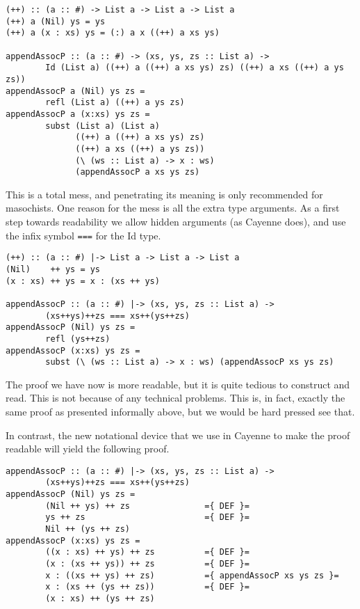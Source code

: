 \documentclass{llncs}[12pt]             %
\newcommand{\te}[1]{{\tt #1}}
\begin{document}
\begin{verbatim}
(++) :: (a :: #) -> List a -> List a -> List a
(++) a (Nil) ys = ys
(++) a (x : xs) ys = (:) a x ((++) a xs ys)

appendAssocP :: (a :: #) -> (xs, ys, zs :: List a) -> 
        Id (List a) ((++) a ((++) a xs ys) zs) ((++) a xs ((++) a ys zs))
appendAssocP a (Nil) ys zs = 
        refl (List a) ((++) a ys zs)
appendAssocP a (x:xs) ys zs =
        subst (List a) (List a) 
              ((++) a ((++) a xs ys) zs)
              ((++) a xs ((++) a ys zs))
              (\ (ws :: List a) -> x : ws)
              (appendAssocP a xs ys zs)
\end{verbatim}

This is a total mess, and penetrating its meaning is only recommended for
masochists.  One reason for the mess is all the extra type arguments.  As a first step
towards readability
we allow hidden arguments (as Cayenne does), and use the infix symbol \te{===}
for the Id type.

\begin{verbatim}
(++) :: (a :: #) |-> List a -> List a -> List a
(Nil)    ++ ys = ys
(x : xs) ++ ys = x : (xs ++ ys)

appendAssocP :: (a :: #) |-> (xs, ys, zs :: List a) -> 
        (xs++ys)++zs === xs++(ys++zs)
appendAssocP (Nil) ys zs = 
        refl (ys++zs)
appendAssocP (x:xs) ys zs =
        subst (\ (ws :: List a) -> x : ws) (appendAssocP xs ys zs)
\end{verbatim}

The proof we have now is more readable, but it is quite tedious to construct
and read.  This is not because of any technical problems.  This is, in fact,
exactly the same proof as presented informally above, but we would be hard pressed
see that.

In contrast, the new notational device that we use in Cayenne to make the proof readable will
yield the following proof.

\begin{verbatim}
appendAssocP :: (a :: #) |-> (xs, ys, zs :: List a) -> 
        (xs++ys)++zs === xs++(ys++zs)
appendAssocP (Nil) ys zs =
        (Nil ++ ys) ++ zs               ={ DEF }=
        ys ++ zs                        ={ DEF }=
        Nil ++ (ys ++ zs)
appendAssocP (x:xs) ys zs =
        ((x : xs) ++ ys) ++ zs          ={ DEF }=
        (x : (xs ++ ys)) ++ zs          ={ DEF }=
        x : ((xs ++ ys) ++ zs)          ={ appendAssocP xs ys zs }=
        x : (xs ++ (ys ++ zs))          ={ DEF }=
        (x : xs) ++ (ys ++ zs)
\end{verbatim}
\end{document}
